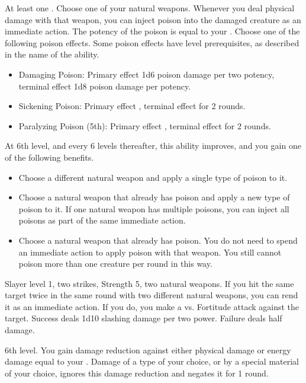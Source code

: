     \featpre At least one .
    \featben Choose one of your natural weapons.
    Whenever you deal physical damage with that weapon, you can inject poison into the damaged creature as an immediate action.
    The potency of the poison is equal to your .
    Choose one of the following poison effects.
    Some poison effects have level prerequisites, as described in the name of the ability.
    \begin{itemize}
        \item Damaging Poison: Primary effect 1d6 poison damage per two potency, terminal effect 1d8 poison damage per potency.
        \item Sickening Poison: Primary effect \sickened, terminal effect \nauseated for 2 rounds.
        \item Paralyzing Poison (5th): Primary effect \immobilized, terminal effect \paralyzed for 2 rounds.
    \end{itemize}

    At 6th level, and every 6 levels thereafter, this ability improves, and you gain one of the following benefits.
    \begin{itemize}
        \item Choose a different natural weapon and apply a single type of poison to it.
        \item Choose a natural weapon that already has poison and apply a new type of poison to it.
            If one natural weapon has multiple poisons, you can inject all poisons as part of the same immediate action.
        \item Choose a natural weapon that already has poison.
            You do not need to spend an immediate action to apply poison with that weapon.
            You still cannot poison more than one creature per round in this way.
    \end{itemize}

    \featpres Slayer level 1, two strikes, Strength 5, two natural weapons.
    \featben If you hit the same target twice in the same round with two different natural weapons, you can rend it as an immediate action.
    If you do, you make a  vs. Fortitude attack against the target.
    Success deals 1d10 slashing damage per two power.
    Failure deals half damage.

    \featpre 6th level.
    \featben You gain damage reduction against either physical damage or energy damage equal to your .
    Damage of a type of your choice, or by a special material of your choice, ignores this damage reduction and negates it for 1 round.

